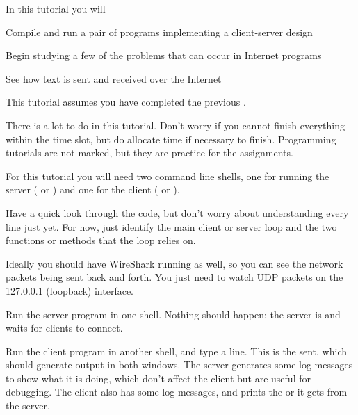 










In this tutorial you will

\DOT Compile and run a pair of programs implementing a client-server design

\DOT Begin studying a few of the problems that can occur in Internet programs

\DOT See how text is sent and received over the Internet

\begin{IMPORTANT}
This tutorial assumes you have completed the previous .

There is a lot to do in this tutorial. Don't worry if you cannot finish everything
within the time slot, but do allocate time if necessary to finish. Programming
tutorials are not marked, but they are practice for the assignments.
\end{IMPORTANT}



For this tutorial you will need two command line shells, one for running
the server ( or ) and one for the client
( or ).

Have a quick look through the code, but don't worry about understanding every
line just yet. For now, just identify the main client or server loop and the two
functions or methods that the loop relies on.

Ideally you should have WireShark running as well, so you can see the network
packets being sent back and forth. You just need to watch UDP packets
on the 127.0.0.1 (loopback) interface.

Run the server program in one shell. Nothing should happen: the server is 
and waits for clients to connect.

Run the client program in another shell, and type a line. This is the 
sent, which should generate output in both windows.
The server generates some log messages to show what it is doing, which don't affect
the client but are useful for debugging. The client also has some log messages, and
prints the  or  it gets from the server.

